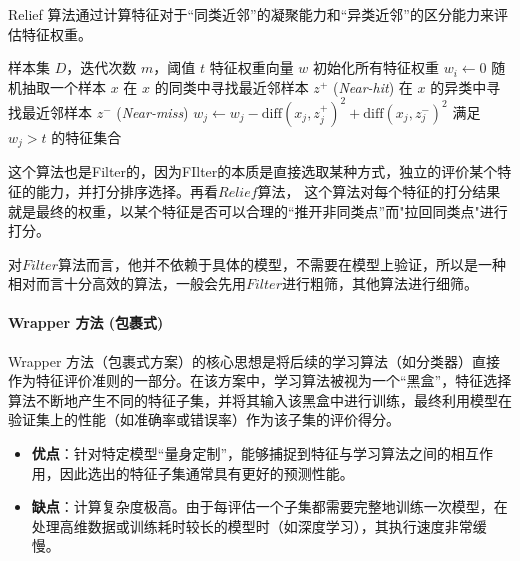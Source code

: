 \begin{example}[Relief 算法]
    Relief 算法通过计算特征对于“同类近邻”的凝聚能力和“异类近邻”的区分能力来评估特征权重。
    
    \begin{algorithm}[H]
    \caption{Relief 算法流程}
    \begin{algorithmic}[1]
        \Require 样本集 $D$，迭代次数 $m$，阈值 $t$
        \Ensure 特征权重向量 $w$
        \State 初始化所有特征权重 $w_i \gets 0$
            \State 随机抽取一个样本 $x$
            \State 在 $x$ 的同类中寻找最近邻样本 $z^+$ (\textit{Near-hit})
            \State 在 $x$ 的异类中寻找最近邻样本 $z^-$ (\textit{Near-miss})
                \State $w_j \gets w_j - \text{diff}(x_j, z^+_j)^2 + \text{diff}(x_j, z^-_j)^2$
            \EndFor
        \EndFor
        \State \Return 满足 $w_j > t$ 的特征集合
    \end{algorithmic}
    \end{algorithm}
    这个算法也是Filter的，因为FIlter的本质是直接选取某种方式，独立的评价某个特征的能力，并打分排序选择。再看$Relief$算法，
    这个算法对每个特征的打分结果就是最终的权重，以某个特征是否可以合理的“推开非同类点”而"拉回同类点"进行打分。
\end{example}
对$Filter$算法而言，他并不依赖于具体的模型，不需要在模型上验证，所以是一种相对而言十分高效的算法，一般会先用$Filter$进行粗筛，其他算法进行细筛。

\paragraph{Wrapper 方法 (包裹式)}
Wrapper 方法（包裹式方案）的核心思想是将后续的学习算法（如分类器）直接作为特征评价准则的一部分。在该方案中，学习算法被视为一个“黑盒”，特征选择算法不断地产生不同的特征子集，并将其输入该黑盒中进行训练，最终利用模型在验证集上的性能（如准确率或错误率）作为该子集的评价得分。

\begin{itemize}
    \item \textbf{优点}：针对特定模型“量身定制”，能够捕捉到特征与学习算法之间的相互作用，因此选出的特征子集通常具有更好的预测性能。
    \item \textbf{缺点}：计算复杂度极高。由于每评估一个子集都需要完整地训练一次模型，在处理高维数据或训练耗时较长的模型时（如深度学习），其执行速度非常缓慢。
\end{itemize}

